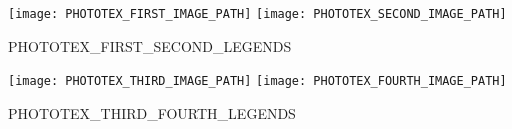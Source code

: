 \begin{minipage}[t][0.025\textheight][t]{\textwidth}
  \hfill\vfill
\end{minipage}
\begin{minipage}[t][0.45\textheight][t]{\textwidth}
  \begin{center}
    \texttt{[image: PHOTOTEX\_FIRST\_IMAGE\_PATH]}\hspace{2em}
    \texttt{[image: PHOTOTEX\_SECOND\_IMAGE\_PATH]}\\[1em]
  \end{center}
\end{minipage}
\begin{minipage}[t][0.03\textheight][t]{\textwidth}
  \begin{center}
    PHOTOTEX_FIRST_SECOND_LEGENDS\\[1em]
  \end{center}
\end{minipage}
\begin{minipage}[t][0.45\textheight][t]{\textwidth}
  \begin{center}
    \texttt{[image: PHOTOTEX\_THIRD\_IMAGE\_PATH]}\hspace{2em}
    \texttt{[image: PHOTOTEX\_FOURTH\_IMAGE\_PATH]}\\[1em]
  \end{center}
\end{minipage}
\begin{minipage}[t][0.03\textheight][t]{\textwidth}
  \begin{center}
    PHOTOTEX_THIRD_FOURTH_LEGENDS\\[1em]
  \end{center}
\end{minipage}

\clearpage
